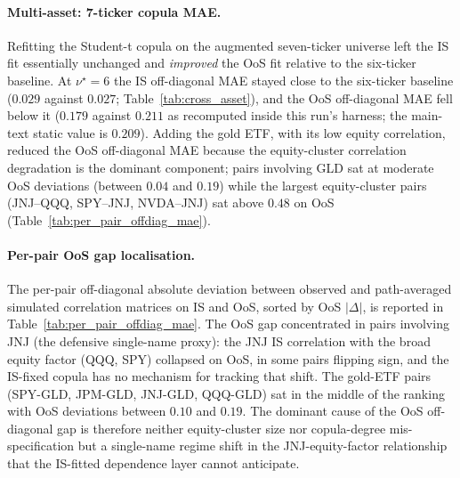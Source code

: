 \paragraph{Multi-asset: 7-ticker copula MAE.}
Refitting the Student-t copula on the augmented seven-ticker universe left the IS fit essentially unchanged and \emph{improved} the OoS fit relative to the six-ticker baseline. At $\nu^\star = 6$ the IS off-diagonal MAE stayed close to the six-ticker baseline ($0.029$ against $0.027$; Table~\ref{tab:cross_asset}), and the OoS off-diagonal MAE fell below it ($0.179$ against $0.211$ as recomputed inside this run's harness; the main-text static value is $0.209$). Adding the gold ETF, with its low equity correlation, reduced the OoS off-diagonal MAE because the equity-cluster correlation degradation is the dominant component; pairs involving GLD sat at moderate OoS deviations (between $0.04$ and $0.19$) while the largest equity-cluster pairs (JNJ--QQQ, SPY--JNJ, NVDA--JNJ) sat above $0.48$ on OoS (Table~\ref{tab:per_pair_offdiag_mae}).

\paragraph{Per-pair OoS gap localisation.}
The per-pair off-diagonal absolute deviation between observed and path-averaged simulated correlation matrices on IS and OoS, sorted by OoS $|\Delta|$, is reported in Table~\ref{tab:per_pair_offdiag_mae}. The OoS gap concentrated in pairs involving JNJ (the defensive single-name proxy): the JNJ IS correlation with the broad equity factor (QQQ, SPY) collapsed on OoS, in some pairs flipping sign, and the IS-fixed copula has no mechanism for tracking that shift. The gold-ETF pairs (SPY-GLD, JPM-GLD, JNJ-GLD, QQQ-GLD) sat in the middle of the ranking with OoS deviations between $0.10$ and $0.19$. The dominant cause of the OoS off-diagonal gap is therefore neither equity-cluster size nor copula-degree mis-specification but a single-name regime shift in the JNJ-equity-factor relationship that the IS-fitted dependence layer cannot anticipate.

